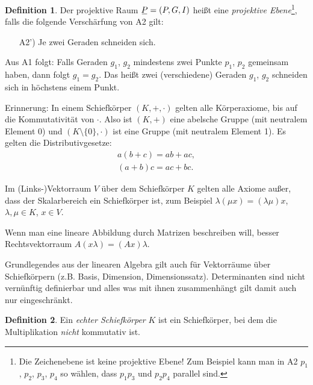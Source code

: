 \documentclass[
 a4paper,
 12pt,
 parskip=half
 ]{scrartcl}
\theoremstyle{plain}
\theoremstyle{definition}
\newtheorem*{defn*}{Definition}
\begin{document}
\begin{defn*}
 Der projektive Raum $\proj = (P,G,I)$ heißt eine \emph{projektive Ebene}\footnote{Die Zeichenebene ist keine projektive Ebene! Zum Beispiel kann man in A2 $p_1$, $p_2$, $p_3$, $p_4$ so wählen, dass $p_1 p_3$ und $p_2 p_4$ parallel sind.}, falls die folgende Verschärfung von A2 gilt:
 \begin{enumerate}[\hspace{.5cm}{A}1)]
  \item [A2')] Je zwei Geraden schneiden sich.
 \end{enumerate}
\end{defn*}

\begin{bem}
 Aus A1 folgt: Falls Geraden $g_1$, $g_2$ mindestens zwei Punkte $p_1$, $p_2$ gemeinsam haben, dann folgt $g_1 = g_2$. Das heißt zwei (verschiedene) Geraden $g_1$, $g_2$ schneiden sich in höchstens einem Punkt.
\end{bem}

Erinnerung: In einem Schiefkörper $(K, +, \cdot)$ gelten alle Körperaxiome, bis auf die Kommutativität von $\cdot$. Also ist $(K, +)$ eine abelsche Gruppe (mit neutralem Element $0$) und $(K \setminus \{ 0 \}, \cdot)$ ist eine Gruppe (mit neutralem Element 1). Es gelten die Distributivgesetze:
\begin{align*}
 a(b+c) = ab + ac, \\
 (a+b)c = ac + bc.
\end{align*}

Im (Links-)Vektorraum $V$ über dem Schiefkörper $K$ gelten alle Axiome außer, dass der Skalarbereich ein Schiefkörper ist, zum Beispiel $\lambda( \mu x ) = (\lambda \mu) x$, $\lambda, \mu \in K$, $x \in V$.

Wenn man eine lineare Abbildung durch Matrizen beschreiben will, besser Rechtsvektorraum $A(x\lambda) = (Ax) \lambda$.

\begin{bem}
 Grundlegendes aus der linearen Algebra gilt auch für Vektorräume über Schiefkörpern (z.B. Basis, Dimension, Dimensionssatz). Determinanten sind nicht vernünf\-tig definierbar und alles was mit ihnen zusammenhängt gilt damit auch nur eingeschränkt.
\end{bem}

\begin{defn*}
 Ein \emph{echter Schiefkörper} $K$ ist ein Schiefkörper, bei dem die Multiplikation \emph{nicht} kommutativ ist.
\end{defn*}
\end{document}
